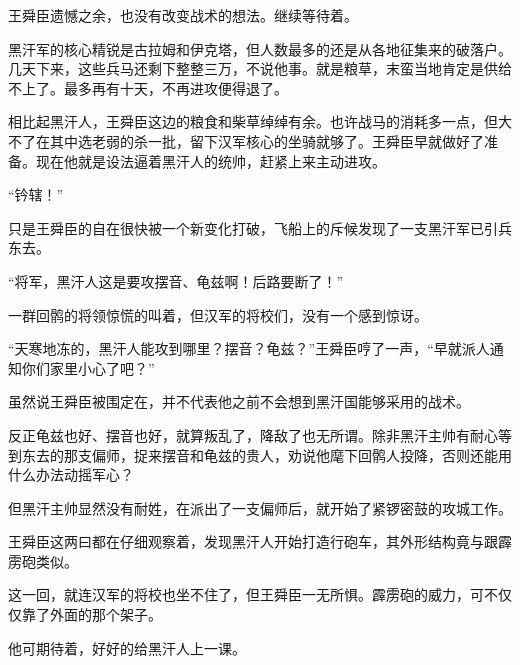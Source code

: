 王舜臣遗憾之余，也没有改变战术的想法。继续等待着。

黑汗军的核心精锐是古拉姆和伊克塔，但人数最多的还是从各地征集来的破落户。几天下来，这些兵马还剩下整整三万，不说他事。就是粮草，末蛮当地肯定是供给不上了。最多再有十天，不再进攻便得退了。

相比起黑汗人，王舜臣这边的粮食和柴草绰绰有余。也许战马的消耗多一点，但大不了在其中选老弱的杀一批，留下汉军核心的坐骑就够了。王舜臣早就做好了准备。现在他就是设法逼着黑汗人的统帅，赶紧上来主动进攻。

“钤辖！”

只是王舜臣的自在很快被一个新变化打破，飞船上的斥候发现了一支黑汗军已引兵东去。

“将军，黑汗人这是要攻摆音、龟兹啊！后路要断了！”

一群回鹘的将领惊慌的叫着，但汉军的将校们，没有一个感到惊讶。

“天寒地冻的，黑汗人能攻到哪里？摆音？龟兹？”王舜臣哼了一声，“早就派人通知你们家里小心了吧？”

虽然说王舜臣被围定在，并不代表他之前不会想到黑汗国能够采用的战术。

反正龟兹也好、摆音也好，就算叛乱了，降敌了也无所谓。除非黑汗主帅有耐心等到东去的那支偏师，捉来摆音和龟兹的贵人，劝说他麾下回鹘人投降，否则还能用什么办法动摇军心？

但黑汗主帅显然没有耐姓，在派出了一支偏师后，就开始了紧锣密鼓的攻城工作。

王舜臣这两曰都在仔细观察着，发现黑汗人开始打造行砲车，其外形结构竟与跟霹雳砲类似。

这一回，就连汉军的将校也坐不住了，但王舜臣一无所惧。霹雳砲的威力，可不仅仅靠了外面的那个架子。

他可期待着，好好的给黑汗人上一课。

